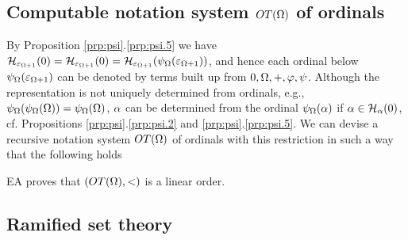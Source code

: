 \documentclass{article}
\begin{document}
\subsection{Computable notation system $OT(\Omega)$ of ordinals}\label{subsec:TOme}

By Proposition \ref{prp:psi}.\ref{prp:psi.5} we have 
${\cal H}_{\varepsilon_{\Omega+1}}(0)={\cal H}_{\varepsilon_{\Omega+1}}(0)=
{\cal H}_{\varepsilon_{\Omega+1}}(\psi_{\Omega}(\varepsilon_{\Omega+1}))$, and hence each ordinal below 
$\psi_{\Omega}(\varepsilon_{\Omega+1})$ can be denoted by terms built up from $0, \Omega, +, \varphi, \psi$.
Although the representation is not uniquely determined from ordinals, e.g., 
$\psi_{\Omega}(\psi_{\Omega}(\Omega))=\psi_{\Omega}(\Omega)$,
$\alpha$ can be determined from the ordinal $\psi_{\Omega}(\alpha)$ 
if $\alpha\in {\cal H}_{\alpha}(0)$, 
cf. Propositions \ref{prp:psi}.\ref{prp:psi.2} and \ref{prp:psi}.\ref{prp:psi.5}.
We can devise a recursive notation system $OT(\Omega)$ of ordinals with this restriction
in such a way that the following holds

\bprp
{\sf EA} proves that $(OT(\Omega),<)$ is a linear order.
\eprp





\subsection{Ramified set theory}


\bdf
\end{document}
